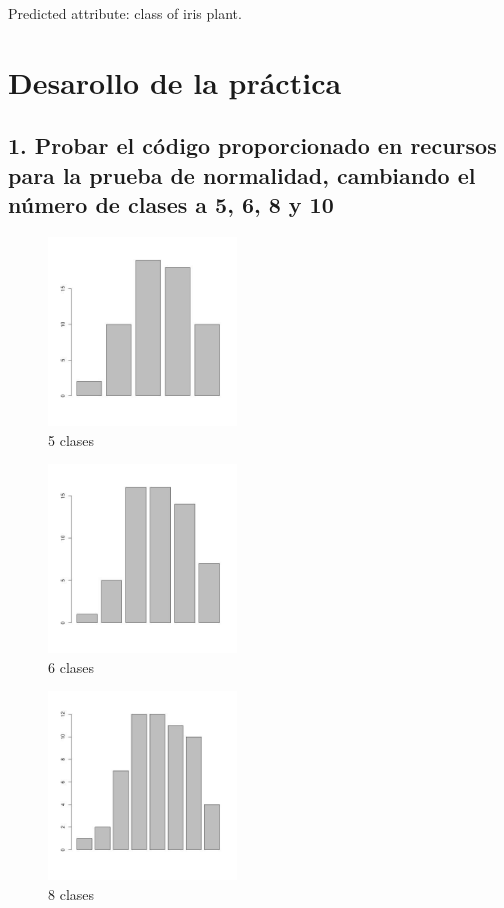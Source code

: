 \documentclass[10pt]{article}
\begin{document}
Predicted attribute: class of iris plant.

\section*{Desarollo de la práctica}
\label{sec:orgadd281e}
\subsection*{1. Probar el código proporcionado en recursos para la prueba de normalidad, cambiando el número de clases a 5, 6, 8 y 10}
\label{sec:orgab49111}

\begin{figure}[htbp]
\centering
\includegraphics[width=5cm]{img/e1.jpeg}
\caption{5 clases}
\end{figure}

\begin{figure}[htbp]
\centering
\includegraphics[width=5cm]{img/e2.jpeg}
\caption{6 clases}
\end{figure}

\begin{figure}[htbp]
\centering
\includegraphics[width=5cm]{img/e3.jpeg}
\caption{8 clases}
\end{figure}
\end{document}
